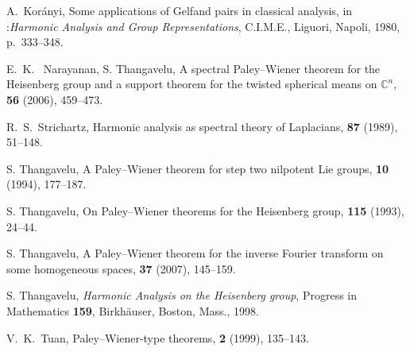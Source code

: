 \documentclass[12pt,a4paper]{amsart}
\theoremstyle{plain}
\theoremstyle{definition}
\numberwithin{equation}{section}
\begin{document}
\begin{thebibliography}{9999}
{{\textrm{{A.~Kor\'anyi,}}}}
{{\textrm {{Some applications of Gelfand pairs in classical analysis}}}},
in :{{\textit{{Harmonic Analysis and Group Representations}}}},
C.I.M.E., Liguori, Napoli, 1980, p.~333--348.

	{{\textrm{{E.~K.~ Narayanan, S. Thangavelu}}}},
	{{\textrm {{A spectral Paley--Wiener theorem for the Heisenberg group 
	and a support theorem for the twisted spherical means on ${\mathbb C}^n$}}}},
 	{{\textit{}}}  
	{{\textbf{{56}}}}  (2006),   459--473.

	{{\textrm{{R.~S.~Strichartz,}}}}
	{{\textrm {{Harmonic analysis as spectral theory of Laplacians}}}}, 
	{{\textit{}}}
	{{\textbf{{87}}}} (1989), 51--148.
	

	{{\textrm{{S. Thangavelu}}}},
 	{{\textrm {{A Paley--Wiener theorem for step two nilpotent Lie groups}}}},
 	{{\textit{}}}  
	{{\textbf{{10}}}}  (1994),   177--187.

	{{\textrm{{S. Thangavelu}}}},
	{{\textrm {{On Paley--Wiener theorems for the Heisenberg group}}}},
 	{{\textit{}}}  
	{{\textbf{{115}}}}  (1993),   24--44.

	{{\textrm{{S. Thangavelu}}}},
	{{\textrm {{A Paley--Wiener theorem for the inverse Fourier transform on some
               homogeneous spaces}}}},
	{{\textit{}}}
	{{\textbf{{37}}}}  (2007),   145--159.
		
		

{{\textrm{{S. Thangavelu}}}},
   {{\textit{{Harmonic Analysis on the Heisenberg group}}}},
   Progress in Mathematics
   {{\textbf{{159}}}},
Birkh\"auser, Boston, Mass., 1998.

	{{\textrm{{V.~K.~Tuan,}}}}
	{{\textrm {{Paley--Wiener-type theorems}}}},
	{{\textit{}}}
	{{\textbf{{2}}}}
	 (1999), 135--143. 

\end{thebibliography}
\end{document}
